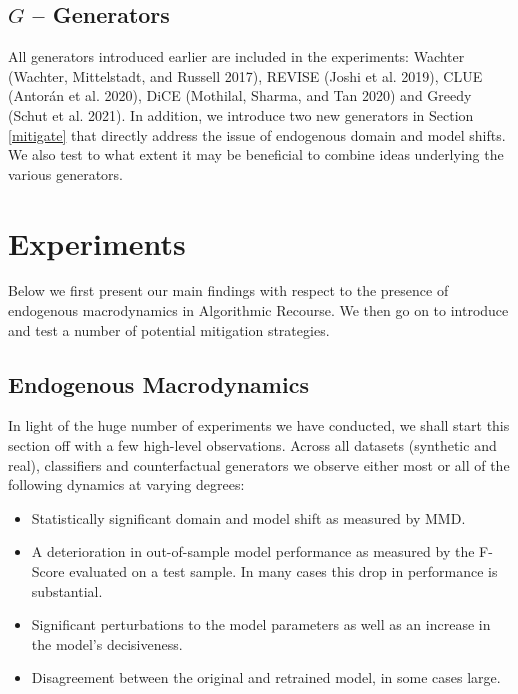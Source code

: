 \documentclass[conference,final,]{IEEEtran}
\providecommand{\tightlist}{%
  \setlength{\itemsep}{0pt}\setlength{\parskip}{0pt}}
\begin{document}
\hypertarget{g-generators}{%
\subsection{\texorpdfstring{\(G\) -- Generators}{G -- Generators}}\label{g-generators}}

All generators introduced earlier are included in the experiments: Wachter (Wachter, Mittelstadt, and Russell 2017), REVISE (Joshi et al. 2019), CLUE (Antorán et al. 2020), DiCE (Mothilal, Sharma, and Tan 2020) and Greedy (Schut et al. 2021). In addition, we introduce two new generators in Section \ref{mitigate} that directly address the issue of endogenous domain and model shifts. We also test to what extent it may be beneficial to combine ideas underlying the various generators.

\hypertarget{empirical-2}{%
\section{Experiments}\label{empirical-2}}

Below we first present our main findings with respect to the presence of endogenous macrodynamics in Algorithmic Recourse. We then go on to introduce and test a number of potential mitigation strategies.

\hypertarget{endogenous-macrodynamics}{%
\subsection{Endogenous Macrodynamics}\label{endogenous-macrodynamics}}

In light of the huge number of experiments we have conducted, we shall start this section off with a few high-level observations. Across all datasets (synthetic and real), classifiers and counterfactual generators we observe either most or all of the following dynamics at varying degrees:

\begin{itemize}
\tightlist
\item
  Statistically significant domain and model shift as measured by MMD.
\item
  A deterioration in out-of-sample model performance as measured by the F-Score evaluated on a test sample. In many cases this drop in performance is substantial.
\item
  Significant perturbations to the model parameters as well as an increase in the model's decisiveness.
\item
  Disagreement between the original and retrained model, in some cases large.
\end{itemize}
\end{document}
